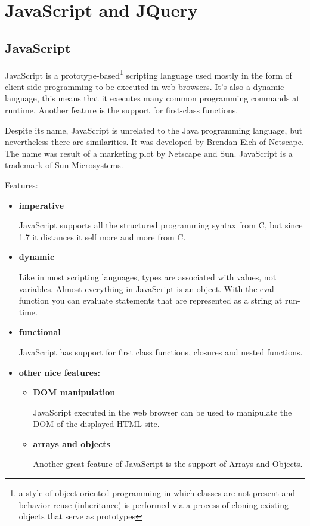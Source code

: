 \section{JavaScript and JQuery}
\subsection{JavaScript}
    JavaScript is a prototype-based\footnote[1]{a style of object-oriented programming in which classes are not present and behavior reuse (inheritance) is performed via a process of cloning existing objects that serve as prototypes} scripting language used mostly in the form of client-side programming to be executed in web browsers. It's also a dynamic language, this means that it executes many common programming commands at runtime. Another feature is the support for first-class functions.

    Despite its name, JavaScript is unrelated to the Java programming language, but nevertheless there are similarities. It was developed by Brendan Eich of Netscape. The name was result of a marketing plot by Netscape and Sun. JavaScript is a trademark of Sun Microsystems.

    Features:
    \begin{itemize}
        \item \textbf{imperative}

            JavaScript supports all the structured programming syntax from C, but since 1.7 it distances it self more and more from C.
        \item \textbf{dynamic}

            Like in most scripting languages, types are associated with values, not variables. Almost everything in JavaScript is an object. With the eval function you can evaluate statements that are represented as a string at run-time.
        \item \textbf{functional}

            JavaScript has support for first class functions, closures and nested functions.
        \item \textbf{other nice features:}

            \begin{itemize}
                \item \textbf{DOM manipulation}

                    JavaScript executed in the web browser can be used to manipulate the DOM of the displayed HTML site.
                \item \textbf{arrays and objects}

                    Another great feature of JavaScript is the support of Arrays and Objects.
            \end{itemize}
    \end{itemize}
